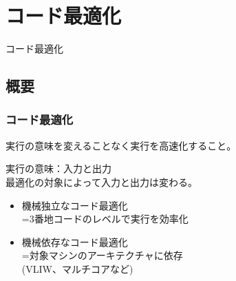 \documentclass[dvipdfmx]{beamer}
\begin{document}














\section{コード最適化}

\begin{frame}
  \begin{center}
    {\Huge コード最適化}
  \end{center}
\end{frame}

\subsection{概要}

\begin{frame}
  \frametitle{コード最適化}

  実行の意味を変えることなく実行を高速化すること。

  \begin{list}{}{}
    \item 実行の意味：入力と出力\\
          最適化の対象によって入力と出力は変わる。\\
  \end{list}


  \begin{itemize}
    \item 機械独立なコード最適化\\
          \quad =3番地コードのレベルで実行を効率化
    \item 機械依存なコード最適化\\
          \quad =対象マシンのアーキテクチャに依存\\
          \qquad (VLIW、マルチコアなど)
  \end{itemize}

\end{frame}
\end{document}
